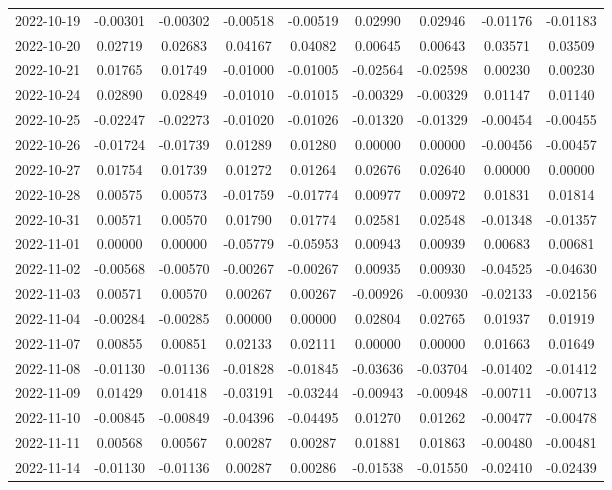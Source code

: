 \begin{footnotesize}
\begin{longtable}{lcccccccc}
2022-10-19 & -0.00301 & -0.00302 & -0.00518 & -0.00519 & 0.02990 & 0.02946 & -0.01176 & -0.01183 \\
2022-10-20 & 0.02719 & 0.02683 & 0.04167 & 0.04082 & 0.00645 & 0.00643 & 0.03571 & 0.03509 \\
2022-10-21 & 0.01765 & 0.01749 & -0.01000 & -0.01005 & -0.02564 & -0.02598 & 0.00230 & 0.00230 \\
2022-10-24 & 0.02890 & 0.02849 & -0.01010 & -0.01015 & -0.00329 & -0.00329 & 0.01147 & 0.01140 \\
2022-10-25 & -0.02247 & -0.02273 & -0.01020 & -0.01026 & -0.01320 & -0.01329 & -0.00454 & -0.00455 \\
2022-10-26 & -0.01724 & -0.01739 & 0.01289 & 0.01280 & 0.00000 & 0.00000 & -0.00456 & -0.00457 \\
2022-10-27 & 0.01754 & 0.01739 & 0.01272 & 0.01264 & 0.02676 & 0.02640 & 0.00000 & 0.00000 \\
2022-10-28 & 0.00575 & 0.00573 & -0.01759 & -0.01774 & 0.00977 & 0.00972 & 0.01831 & 0.01814 \\
2022-10-31 & 0.00571 & 0.00570 & 0.01790 & 0.01774 & 0.02581 & 0.02548 & -0.01348 & -0.01357 \\
2022-11-01 & 0.00000 & 0.00000 & -0.05779 & -0.05953 & 0.00943 & 0.00939 & 0.00683 & 0.00681 \\
2022-11-02 & -0.00568 & -0.00570 & -0.00267 & -0.00267 & 0.00935 & 0.00930 & -0.04525 & -0.04630 \\
2022-11-03 & 0.00571 & 0.00570 & 0.00267 & 0.00267 & -0.00926 & -0.00930 & -0.02133 & -0.02156 \\
2022-11-04 & -0.00284 & -0.00285 & 0.00000 & 0.00000 & 0.02804 & 0.02765 & 0.01937 & 0.01919 \\
2022-11-07 & 0.00855 & 0.00851 & 0.02133 & 0.02111 & 0.00000 & 0.00000 & 0.01663 & 0.01649 \\
2022-11-08 & -0.01130 & -0.01136 & -0.01828 & -0.01845 & -0.03636 & -0.03704 & -0.01402 & -0.01412 \\
2022-11-09 & 0.01429 & 0.01418 & -0.03191 & -0.03244 & -0.00943 & -0.00948 & -0.00711 & -0.00713 \\
2022-11-10 & -0.00845 & -0.00849 & -0.04396 & -0.04495 & 0.01270 & 0.01262 & -0.00477 & -0.00478 \\
2022-11-11 & 0.00568 & 0.00567 & 0.00287 & 0.00287 & 0.01881 & 0.01863 & -0.00480 & -0.00481 \\
2022-11-14 & -0.01130 & -0.01136 & 0.00287 & 0.00286 & -0.01538 & -0.01550 & -0.02410 & -0.02439 \\

\end{longtable}
\end{footnotesize}
